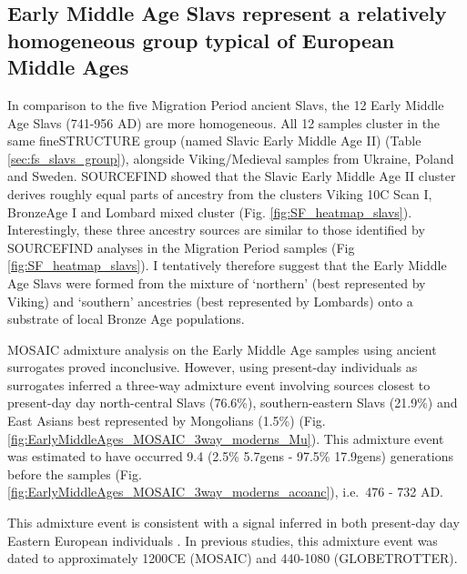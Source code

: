 \subsection{Early Middle Age Slavs represent a relatively homogeneous group typical of European Middle Ages}

In comparison to the five Migration Period ancient Slavs, the 12 Early Middle Age Slavs (741-956 AD) are more homogeneous. All 12 samples cluster in the same fineSTRUCTURE group (named Slavic Early Middle Age II) (Table \ref{sec:fs_slavs_group}), alongside Viking/Medieval samples from Ukraine, Poland and Sweden. SOURCEFIND showed that the Slavic Early Middle Age II cluster derives roughly equal parts of ancestry from the clusters Viking 10C Scan I, BronzeAge I and Lombard mixed cluster (Fig. \ref{fig:SF_heatmap_slavs}). Interestingly, these three ancestry sources are similar to those identified by SOURCEFIND analyses in the Migration Period samples (Fig \ref{fig:SF_heatmap_slavs}). I tentatively therefore suggest that the Early Middle Age Slavs were formed from the mixture of `northern' (best represented by Viking) and `southern' ancestries (best represented by Lombards) onto a substrate of local Bronze Age populations.

MOSAIC admixture analysis on the Early Middle Age samples using ancient surrogates proved inconclusive. However, using present-day individuals as surrogates inferred a three-way admixture event involving sources closest to present-day day north-central Slavs (76.6\%), southern-eastern Slavs (21.9\%) and East Asians best represented by Mongolians (1.5\%) (Fig. \ref{fig:EarlyMiddleAges_MOSAIC_3way_moderns_Mu}). This admixture event was estimated to have occurred 9.4 (2.5\% 5.7gens - 97.5\% 17.9gens) generations before the samples (Fig. \ref{fig:EarlyMiddleAges_MOSAIC_3way_moderns_acoanc}), i.e.\ 476 - 732 AD. 

This admixture event is consistent with a signal inferred in both present-day day Eastern European individuals \cite{MOSAIC_2019, Hellenthal2014}. In previous studies, this admixture event was dated to approximately 1200CE (MOSAIC) and 440-1080 (GLOBETROTTER).

